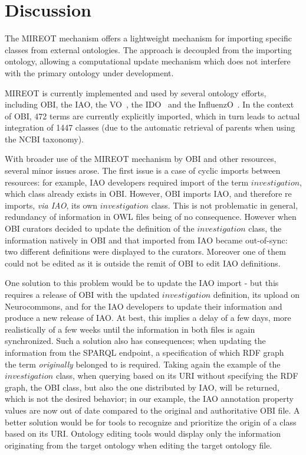 \documentclass[jou]{ao2e}%
\begin{document}
\section{Discussion}

The MIREOT mechanism offers a lightweight mechanism for importing specific classes from external ontologies. The approach is decoupled from the importing ontology, allowing a computational update mechanism which does not interfere with the primary ontology under development.

\ac{MIREOT} is currently implemented and used by several ontology efforts, including \ac{OBI}, the \ac{IAO}, the \ac{VO}~\citep{VO}, the \ac{IDO}~\citep{IDO} and the \ac{InfluenzO}~\citep{InfluenzO}.
In the context of \ac{OBI}, 472 terms are currently explicitly imported, which in turn leads to actual integration of 1447 classes (due to the automatic retrieval of parents when using the NCBI taxonomy). 



With broader use of the MIREOT mechanism by OBI and other resources, several minor issues arose.
The first issue is a case of cyclic imports between resources: for example, \ac{IAO} developers required import of the term $investigation$, which class already exists in \ac{OBI}.
However, \ac{OBI} imports \ac{IAO}, and therefore re imports, \emph{via IAO}, its own $investigation$ class. This is not problematic in general, redundancy of information in OWL files being of no consequence. However when \ac{OBI} curators decided to update the definition of the $investigation$ class, the information natively in \ac{OBI} and that imported from \ac{IAO} became out-of-sync: two different definitions were displayed to the curators. Moreover one of them could not be edited as it is outside the remit of OBI to edit IAO definitions.

One solution to this problem would be to update the \ac{IAO} import - but this requires a release of \ac{OBI} with the updated $investigation$ definition, its upload on Neurocommons, and for the \ac{IAO} developers to update their information and produce a new release of \ac{IAO}. At best, this implies a delay of a few days, more realistically of a few weeks until the information in both files is again synchronized.
Such a solution also has consequences; when updating the information from the SPARQL endpoint, a specification of which \ac{RDF} graph~\citep{RDF} the term \emph{originally} belonged to is required. Taking again the example of the $investigation$ class, when querying based on its URI without specifying the RDF graph, the \ac{OBI} class, but also the one distributed by \ac{IAO}, will be returned, which is not the desired behavior; in our example, the \ac{IAO} annotation property values are now out of date compared to the original and authoritative \ac{OBI} file. 
A better solution would be for tools to recognize and prioritize the origin of a class based on its URI. Ontology editing tools would display only the information originating from the target ontology when editing the target ontology file.
\end{document}
